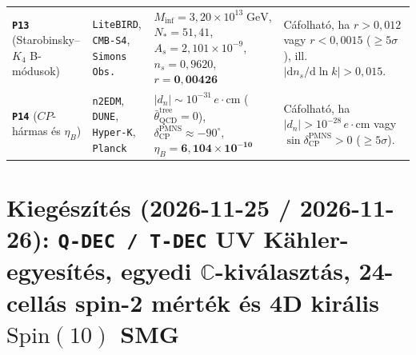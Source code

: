 \documentclass[11pt,a4paper]{article}
\begin{document}
\begin{table}[htbp]
\begin{tabularx}{\textwidth}{@{}p{}p{}p{}X@{}}
\textbf{\texttt{P13}} (Starobinsky--$K_4$ B-módusok) & \texttt{LiteBIRD}, \texttt{CMB-S4}, \texttt{Simons Obs.} & $M_{\mathrm{inf}}=3{,}20\times 10^{13}\;\mathrm{GeV}$, $N_*=51{,}41$, $A_s=2{,}101\times 10^{-9}$, $n_s=0{,}9620$, $r=\mathbf{0{,}00426}$ & Cáfolható, ha $r > 0{,}012$ vagy $r < 0{,}0015$ ($\ge 5\sigma$), ill.\ $|\mathrm{d}n_s/\mathrm{d}\ln k| > 0{,}015$. \\
\textbf{\texttt{P14}} ($CP$-hármas és $\eta_B$) & \texttt{n2EDM}, \texttt{DUNE}, \texttt{Hyper-K}, \texttt{Planck} & $|d_n|\sim 10^{-31}\,e\cdot\mathrm{cm}$ ($\bar{\theta}_{\mathrm{QCD}}^{\mathrm{tree}}=0$), $\delta_{\mathrm{CP}}^{\mathrm{PMNS}}\approx -90^\circ$, $\eta_B=\mathbf{6{,}104\times 10^{-10}}$ & Cáfolható, ha $|d_n| > 10^{-28}\,e\cdot\mathrm{cm}$ vagy $\sin\delta_{\mathrm{CP}}^{\mathrm{PMNS}} > 0$ ($\ge 5\sigma$). \\
\bottomrule
\end{tabularx}
\end{table}

\section{Kiegészítés (2026-11-25 / 2026-11-26): \texttt{Q-DEC / T-DEC} UV K\"ahler-egyesítés, egyedi \texorpdfstring{$\mathbb{C}$}{C}-kiválasztás, 24-cellás spin-2 mérték és 4D királis \texorpdfstring{$\mathrm{Spin}(10)$}{Spin(10)} SMG}
\label{sec:p22-addendum-2026-11-25-hu}
\end{document}
